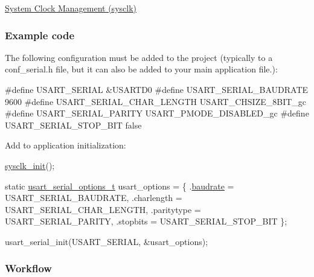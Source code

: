\begin{DoxyEnumerate}
\item \hyperlink{group__sysclk__group}{System Clock Management (sysclk)}
\end{DoxyEnumerate}\hypertarget{serial_use_case_1_serial_use_case_1_setup_code}{}\subsubsection{Example code}\label{serial_use_case_1_serial_use_case_1_setup_code}
The following configuration must be added to the project (typically to a conf\-\_\-serial.\-h file, but it can also be added to your main application file.)\-: 
\begin{DoxyCode}
\textcolor{preprocessor}{        #define USART\_SERIAL                     &USARTD0}
\textcolor{preprocessor}{}\textcolor{preprocessor}{        #define USART\_SERIAL\_BAUDRATE            9600}
\textcolor{preprocessor}{}\textcolor{preprocessor}{        #define USART\_SERIAL\_CHAR\_LENGTH         USART\_CHSIZE\_8BIT\_gc}
\textcolor{preprocessor}{}\textcolor{preprocessor}{        #define USART\_SERIAL\_PARITY              USART\_PMODE\_DISABLED\_gc}
\textcolor{preprocessor}{        #define USART\_SERIAL\_STOP\_BIT            false}
\end{DoxyCode}


Add to application initialization\-: 
\begin{DoxyCode}
            \hyperlink{group__sysclk__group_ga242399e48a97739c88b4d0c00f6101de}{sysclk\_init}();

            \textcolor{keyword}{static} \hyperlink{structusart__rs232__options}{usart\_serial\_options\_t} usart\_options =
       \{
               .\hyperlink{structusart__rs232__options_a2c48c35d680d4805d357677d7d352fd0}{baudrate} = USART\_SERIAL\_BAUDRATE,
               .charlength = USART\_SERIAL\_CHAR\_LENGTH,
               .paritytype = USART\_SERIAL\_PARITY,
               .stopbits = USART\_SERIAL\_STOP\_BIT
            \};

            usart\_serial\_init(USART\_SERIAL, &usart\_options);
\end{DoxyCode}
\hypertarget{serial_use_case_1_serial_use_case_1_setup_flow}{}\subsubsection{Workflow}\label{serial_use_case_1_serial_use_case_1_setup_flow}

